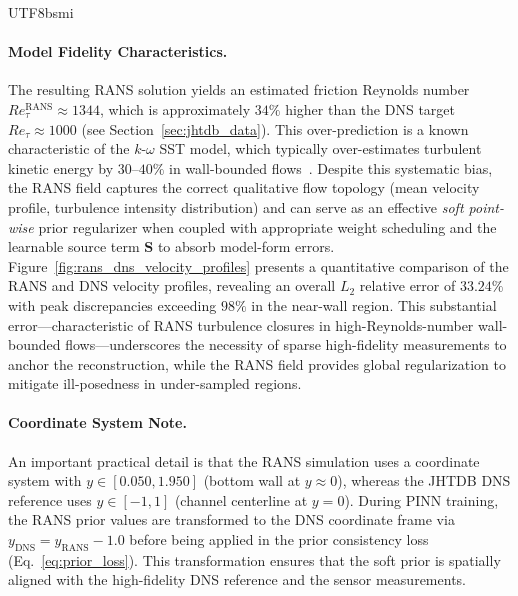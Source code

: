 \documentclass[master]{NTHUthesis}
\begin{document}
\begin{CJK*}{UTF8}{bsmi}
\paragraph{Model Fidelity Characteristics.}
The resulting RANS solution yields an estimated friction Reynolds number $Re_\tau^{\text{RANS}} \approx 1344$, which is approximately $34\%$ higher than the DNS target $Re_\tau \approx 1000$ (see Section~\ref{sec:jhtdb_data}). This over-prediction is a known characteristic of the $k$-$\omega$ SST model, which typically over-estimates turbulent kinetic energy by $30$--$40\%$ in wall-bounded flows~\cite{Menter1994}. Despite this systematic bias, the RANS field captures the correct qualitative flow topology (mean velocity profile, turbulence intensity distribution) and can serve as an effective \emph{soft point-wise} prior regularizer when coupled with appropriate weight scheduling and the learnable source term $\mathbf{S}$ to absorb model-form errors.
Figure~\ref{fig:rans_dns_velocity_profiles} presents a quantitative comparison of the RANS and DNS velocity profiles, revealing an overall $L_2$ relative error of $33.24\%$ with peak discrepancies exceeding $98\%$ in the near-wall region. This substantial error---characteristic of RANS turbulence closures in high-Reynolds-number wall-bounded flows---underscores the necessity of sparse high-fidelity measurements to anchor the reconstruction, while the RANS field provides global regularization to mitigate ill-posedness in under-sampled regions.

\paragraph{Coordinate System Note.}
An important practical detail is that the RANS simulation uses a coordinate system with $y \in [0.050, 1.950]$ (bottom wall at $y \approx 0$), whereas the JHTDB DNS reference uses $y \in [-1, 1]$ (channel centerline at $y = 0$). During PINN training, the RANS prior values are transformed to the DNS coordinate frame via $y_{\text{DNS}} = y_{\text{RANS}} - 1.0$ before being applied in the prior consistency loss (Eq.~\ref{eq:prior_loss}). This transformation ensures that the soft prior is spatially aligned with the high-fidelity DNS reference and the sensor measurements.


\end{CJK*}
\end{document}
